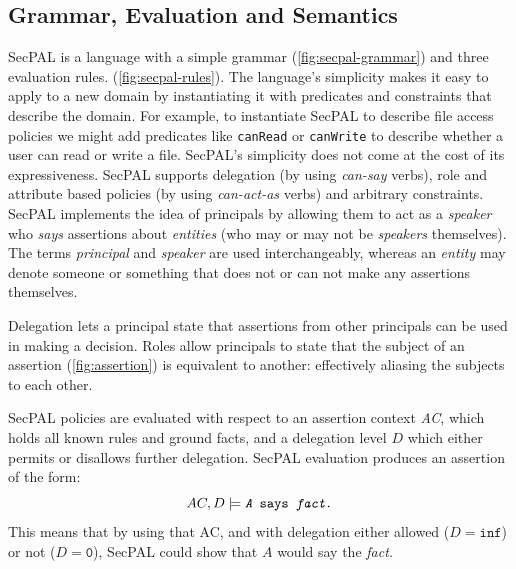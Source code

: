 \documentclass[thesis.tex]{subfiles}
\begin{document}
\subsection{Grammar, Evaluation and Semantics}
\label{ssec:grammar-evaluation-semantics}

SecPAL is a language with a simple grammar
(\autoref{fig:secpal-grammar}) and three evaluation
rules. (\autoref{fig:secpal-rules}). The language's simplicity makes
it easy to apply to a new domain by instantiating it with predicates
and constraints that describe the domain. For example, to instantiate
SecPAL to describe file access policies we might add predicates like
\texttt{canRead} or \texttt{canWrite} to describe whether a user can
read or write a file. SecPAL's simplicity does not come at the cost of
its expressiveness. SecPAL supports delegation (by using
\emph{can-say} verbs), role and attribute based policies (by using
\emph{can-act-as} verbs) and arbitrary constraints.
SecPAL implements the idea of principals by allowing them to act as a \emph{speaker} who \emph{says} assertions about \emph{entities} (who may or may not be \emph{speakers} themselves). The terms \emph{principal} and \emph{speaker} are used interchangeably, whereas an \emph{entity} may denote someone or something that does not or can not make any assertions themselves.

Delegation lets a
principal state that assertions from other principals can be used in
making a decision. Roles allow principals to state that the subject
of an assertion (\autoref{fig:assertion}) is equivalent to another: effectively aliasing the
subjects to each other.

SecPAL policies are evaluated with respect to an assertion context
\emph{AC}, which holds all known rules and ground facts, and a
delegation level $D$ which either permits or disallows further
delegation. SecPAL evaluation produces an assertion of the form:
\begin{equation*}
 AC, D \models \texttt{{\itshape A} says {\itshape fact}.} 
\end{equation*}
This means that by using that AC, and with delegation either
allowed ($D = \mathtt{inf}$) or not ($D = \mathtt{0}$), SecPAL could show that
$A$ would say the \emph{fact.}
\end{document}
